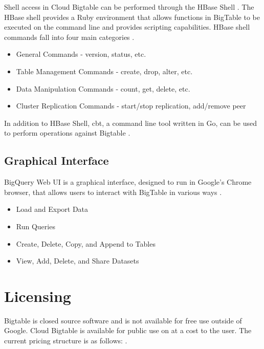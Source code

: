\documentclass[9pt,twocolumn,twoside]{styles/osajnl}
\begin{document}
Shell access in Cloud Bigtable can be performed through the HBase Shell \cite{www-hbaseshell}. The HBase shell provides a Ruby environment that allows functions in BigTable to be executed on the command line and provides scripting capabilities. HBase shell commands fall into four main categories \cite{www-hbaseshell2}.

\vspace{-\topsep}
\begin{itemize}
\item General Commands - version, status, etc.
\item Table Management Commands - create, drop, alter, etc.
\item Data Manipulation Commands - count, get, delete, etc.
\item Cluster Replication Commands - start/stop replication, add/remove peer 
\end{itemize}
\vspace{-\topsep}

In addition to HBase Shell, cbt, a command line tool written in Go, can be used to perform operations against Bigtable \cite{www-cbt}. 


\subsection{Graphical Interface}

BigQuery Web UI is a graphical interface, designed to run in Google's Chrome browser, that allows users to interact with BigTable in various ways \cite{www-bigquerywebui}.

\vspace{-\topsep}
\begin{itemize}
\item Load and Export Data
\item Run Queries
\item Create, Delete, Copy, and Append to Tables 
\item View, Add, Delete, and Share Datasets 
\end{itemize}
\vspace{-\topsep}


\section{Licensing}

Bigtable is closed source software and is not available for free use outside of Google. Cloud Bigtable is available for public use on at a cost to the user. The current pricing structure is as follows: \cite{www-cloudbigtable}.
\end{document}
